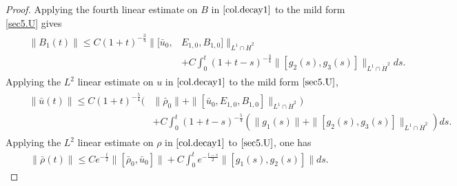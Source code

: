 \documentclass[11pt]{amsart}
\numberwithin{equation}{section}
\begin{document}
\begin{proof}
Applying the  fourth linear estimate on $B$ in $\eqref{col.decay1}$
to the mild form \eqref{sec5.U} gives
\begin{eqnarray}\label{sec5.decayB}
&&\begin{aligned} \|B_{1}(t)\|\leq C (1+t)^{-\frac{3}{4}}
 \|[\bar{u}_{0},& E_{1,0},B_{1,0}]\|_{L^1\cap \dot{H}^{2}}\\
&+C
\int_{0}^{t}(1+t-s)^{-\frac{3}{4}}\|[g_{2}(s),g_{3}(s)]\|_{L^{1}\cap\dot{H}^{2}}ds.
\end{aligned}
\end{eqnarray}
Applying the $L^{2}$ linear estimate on $u$ in $\eqref{col.decay1}$
to the mild form $\eqref{sec5.U}$,
\begin{eqnarray}\label{baruL2}
 &&\begin{aligned}
\|\bar{u}(t)\| \leq C(1+t)^{-\frac{5}{4}}(
 &\|\bar{\rho}_{0}\|+\|[\bar{u}_{0}, E_{1,0},B_{1,0}]\|_{L^{1}\cap\dot{H}^{2}})\\
  &+C \int_{0}^{t}(1+t-s)^{-\frac{5}{4}}\left(\|g_{1}(s)\|+\|[g_{2}(s),g_{3}(s)]\|_{L^{1}\cap
  \dot{H}^{2}}\right)ds.
 \end{aligned}
\end{eqnarray}
Applying the $L^{2}$ linear estimate on $\rho$ in
$\eqref{col.decay1}$ to $\eqref{sec5.U}$, one has
\begin{eqnarray}\label{rhoL2}
\|\bar{\rho}(t)\|\leq C
e^{-\frac{t}{2}}\|[\bar{\rho}_{0},\bar{u}_{0}]\|+ C
 \int_{0}^{t}e^{-\frac{t-s}{2}}\|[g_{1}(s),g_{2}(s)]\|d s.
\end{eqnarray}


\end{proof}
\end{document}
